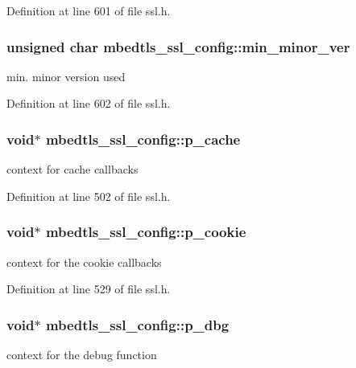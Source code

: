 Definition at line 601 of file ssl.\-h.

\hypertarget{structmbedtls__ssl__config_a61579a80f1aa272cc8d9f7c2786b7b30}{
\subsubsection[{min\-\_\-minor\-\_\-ver}]{\setlength{\rightskip}{0pt plus 5cm}unsigned char mbedtls\-\_\-ssl\-\_\-config\-::min\-\_\-minor\-\_\-ver}}\label{structmbedtls__ssl__config_a61579a80f1aa272cc8d9f7c2786b7b30}
min. minor version used 

Definition at line 602 of file ssl.\-h.

\hypertarget{structmbedtls__ssl__config_ac5f5d3d7a788e65c722db381c66ecb24}{
\subsubsection[{p\-\_\-cache}]{\setlength{\rightskip}{0pt plus 5cm}void$\ast$ mbedtls\-\_\-ssl\-\_\-config\-::p\-\_\-cache}}\label{structmbedtls__ssl__config_ac5f5d3d7a788e65c722db381c66ecb24}
context for cache callbacks 

Definition at line 502 of file ssl.\-h.

\hypertarget{structmbedtls__ssl__config_a227d50ad74b96adcc59a8fdee0f618a4}{
\subsubsection[{p\-\_\-cookie}]{\setlength{\rightskip}{0pt plus 5cm}void$\ast$ mbedtls\-\_\-ssl\-\_\-config\-::p\-\_\-cookie}}\label{structmbedtls__ssl__config_a227d50ad74b96adcc59a8fdee0f618a4}
context for the cookie callbacks 

Definition at line 529 of file ssl.\-h.

\hypertarget{structmbedtls__ssl__config_ad591b46fdb117d844c0a5f7366423c48}{
\subsubsection[{p\-\_\-dbg}]{\setlength{\rightskip}{0pt plus 5cm}void$\ast$ mbedtls\-\_\-ssl\-\_\-config\-::p\-\_\-dbg}}\label{structmbedtls__ssl__config_ad591b46fdb117d844c0a5f7366423c48}
context for the debug function 

